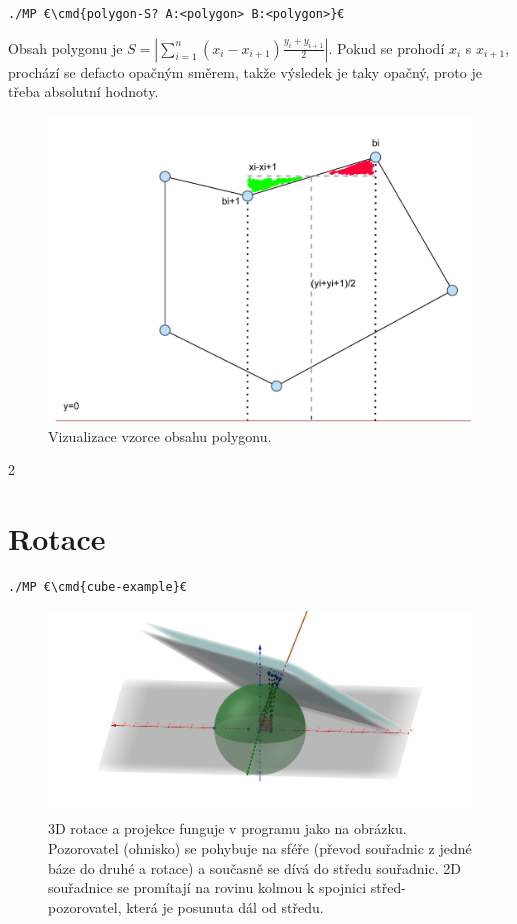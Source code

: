 \documentclass[a4paper,12pt]{report}
\newcommand{\cmd}[1]{\textcolor{blue}{\textbf{#1}}}
\begin{document}
\begin{lstlisting}
./MP €\cmd{polygon-S? A:<polygon> B:<polygon>}€
\end{lstlisting}

\begin{multicols}{2}

Obsah polygonu je
$S = |\sum\limits_{i=1}^{n} (x_{i}-x_{i+1})\frac{y_{i}+y_{i+1}}{2}|$.
Pokud se prohodí $x_{i}$ s $x_{i+1}$, prochází se defacto opačným směrem, takže výsledek je taky opačný, proto je třeba absolutní hodnoty.



\begin{figure}[H]
  \centering
  \includegraphics[width=.5\textwidth]{fig8.png}
  \caption{Vizualizace vzorce obsahu polygonu.}
\end{figure}
\end{multicols}{2}



\chapter{Rotace}

\begin{lstlisting}
./MP €\cmd{cube-example}€ 
\end{lstlisting}

\begin{figure}[H]
    \centering
    \includegraphics[width=1\textwidth]{fig10.png}
    \caption{3D rotace a projekce funguje v programu jako na obrázku. Pozorovatel (ohnisko) se pohybuje na sféře (převod souřadnic z jedné báze do druhé a rotace) a současně se dívá do středu souřadnic. 2D souřadnice se promítají na rovinu kolmou k spojnici střed-pozorovatel, která je posunuta dál od středu.}
    \label{fig:rotace_pozorovatel}
\end{figure}
\end{document}
